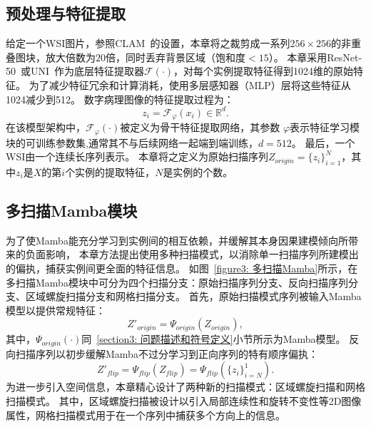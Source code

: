 \subsection[\hspace{-2pt}预处理与特征提取]{{\heiti{} \hspace{-8pt}预处理与特征提取}}\label{section3: 预处理与特征提取}

给定一个WSI图片，参照CLAM~\cite{lu2021data}的设置，本章将之裁剪成一系列$256\times256$的非重叠图块，放大倍数为$20$倍，同时丢弃背景区域（饱和度$< 15$）。
本章采用ResNet-50~\cite{ROYERCARFAGNI2001253}或UNI~\cite{chen2024towards}作为底层特征提取器$\mathcal{F}\left(\cdot\right)$，对每个实例提取特征得到1024维的原始特征。
为了减少特征冗余和计算消耗，使用多层感知器（MLP）层将这些特征从1024减少到512。
数字病理图像的特征提取过程为：
\begin{equation}
  z_i= \mathcal{F}_\varphi(x_i) \in \mathbb{R} ^d.
\end{equation}
在该模型架构中，$\mathcal{F}_\varphi(\cdot)$被定义为骨干特征提取网络，其参数 $\varphi$表示特征学习模块的可训练参数集,通常其不与后续网络一起端到端训练，$d= 512$。
最后，一个WSI由一个连续长序列表示。
本章将之定义为原始扫描序列$Z_{origin}=\{z_i\}_{i=1}^N$，其中$z_i$是$X$的第$i$个实例的提取特征，$N$是实例的个数。

\subsection[\hspace{-2pt}多扫描Mamba模块]{{\heiti{} \hspace{-8pt}多扫描Mamba模块}}\label{section3: 多扫描Mamba模块}

为了使Mamba能充分学习到实例间的相互依赖，并缓解其本身因果建模倾向所带来的负面影响，
本章方法提出使用多种扫描模式，以消除单一扫描序列所建模出的偏执，捕获实例间更全面的特征信息。
如图~\ref{figure3: 多扫描Mamba}所示，在多扫描Mamba模块中可分为四个扫描分支：原始扫描序列分支、反向扫描序列分支、区域螺旋扫描分支和网格扫描分支。
首先，原始扫描模式序列被输入Mamba模型以提供常规特征：
\begin{equation}
  Z'_{origin}=\Psi_{origin} (Z_{origin}),
\end{equation}
其中，$\Psi_{origin}(\cdot)$同~\ref{section3: 问题描述和符号定义}小节所示为Mamba模型。 反向扫描序列以初步缓解Mamba不过分学习到正向序列的特有顺序偏执：
\begin{equation}
  Z'_{flip}=\Psi_{flip} (Z_{flip})=\Psi_{flip} (\{z_i\}_{i=N}^1).
\end{equation}
为进一步引入空间信息，本章精心设计了两种新的扫描模式：区域螺旋扫描和网格扫描模式。
其中，区域螺旋扫描被设计以引入局部连续性和旋转不变性等2D图像属性，网格扫描模式用于在一个序列中捕获多个方向上的信息。




